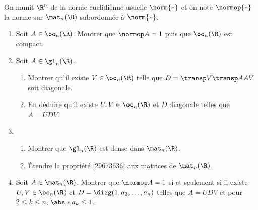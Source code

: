 \begin{enonce}
\begin{exercise}[ID={RMS 122-2 E853},subtitle={},tags={}]
  On munit $\R^n$ de la norme euclidienne usuelle $\norm{*}$ et on note $\normop{*}$ la norme sur $\mat_n(\R)$ subordonnée à $\norm{*}$.
\begin{enumerate}
  \item Soit $A\in\oo_n(\R)$. Montrer que $\normop A=1$ puis que $\oo_n(\R)$ est compact.
  \item Soit $A\in\gl_n(\R)$.
    \begin{enumerate}
      \item 
Montrer qu'il existe $V\in\oo_n(\R)$ telle que $D=\transp V\transp A AV$ soit diagonale.
      \item \label{29673636}
        En déduire qu'il existe $U,V\in\oo_n(\R)$ et $D$ diagonale telles que $A=UDV$.
    \end{enumerate}
  \item
    \begin{enumerate}
      \item Montrer que $\gl_n(\R)$ est dense dans $\mat_n(\R)$.
      \item Étendre la propriété \ref{29673636} aux matrices de $\mat_n(\R)$.
    \end{enumerate}
  \item Soit $A\in\mat_n(\R)$.
    Montrer que $\normop A=1$ si et seulement si il existe $U,V\in\oo_n(\R)$ et $D=\diag(1,a_2,\dotsc,a_n)$ telles que $A=UDV$ et pour $2\leq k\leq n$, $\abs*{a_k}\leq1$.
\end{enumerate}
\end{exercise}
\begin{solution}
\end{solution}
\end{enonce}
